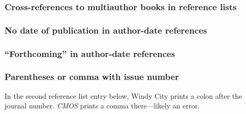 \documentclass[11pt,letterpaper,oneside]{article}
\begin{document}
\subsubsection{Cross-references to multiauthor books in reference lists}
\label{15.42}

\begin{citeref}
\item \parencite{draper1987}
\item \parencite{harrington1987}
\item \parencite{zukowsky1987}
\end{citeref}

\setcounter{subsubsection}{43}
\subsubsection{No date of publication in author-date references}

\begin{citeref}
\item \parencite{nano1750}
\item \parencite{nano}
\end{citeref}

\subsubsection{``Forthcoming'' in author-date references}

\begin{citeref}
\item \parencite{faraday}
\end{citeref}

\setcounter{subsubsection}{46}
\subsubsection{Parentheses or comma with issue number}

In the second reference list entry below, Windy City prints a colon
after the journal number. \textit{CMOS} prints a comma there---likely
an error.

\begin{citeref}
\item \parencite{glass2014}
\item \parencite{meyerovitch1959}
\end{citeref}
\end{document}
